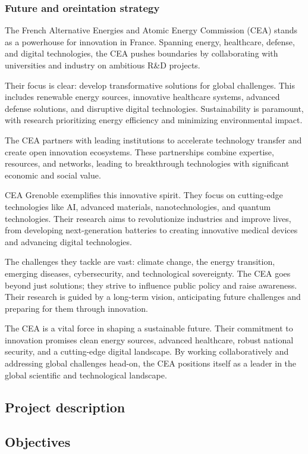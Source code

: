 \subsubsection{Future and oreintation strategy}

\medskip

The French Alternative Energies and Atomic Energy Commission (CEA) stands as a powerhouse for innovation in France.
  Spanning energy, healthcare, defense, and digital technologies, the CEA pushes boundaries by collaborating with universities
  and industry on ambitious R\&D projects.

\medskip

Their focus is clear: develop transformative solutions for global challenges. 
 This includes renewable energy sources, innovative healthcare systems, advanced defense solutions, 
 and disruptive digital technologies.  Sustainability is paramount, with research prioritizing energy 
 efficiency and minimizing environmental impact.

\medskip

The CEA partners with leading institutions to accelerate technology transfer and create open innovation ecosystems. 
 These partnerships combine expertise, resources, and networks, leading to breakthrough technologies with significant 
 economic and social value.

\medskip

CEA Grenoble exemplifies this innovative spirit. They focus on cutting-edge technologies like AI, advanced materials,
 nanotechnologies, and quantum technologies.  Their research aims to revolutionize industries and improve lives, from
 developing next-generation batteries to creating innovative medical devices and advancing digital technologies.

\medskip

The challenges they tackle are vast: climate change, the energy transition, emerging diseases, cybersecurity, and 
technological sovereignty.  The CEA goes beyond just solutions; they strive to influence public policy and raise awareness. 
 Their research is guided by a long-term vision, anticipating future challenges and preparing for them through innovation.

\medskip

The CEA is a vital force in shaping a sustainable future.  Their commitment to innovation promises clean energy sources, 
advanced healthcare, robust national security, and a cutting-edge digital landscape.  By working collaboratively and addressing
 global challenges head-on, the CEA positions itself as a leader in the global scientific and technological landscape.

\medskip

\subsection{Project description}
\subsection{Objectives}